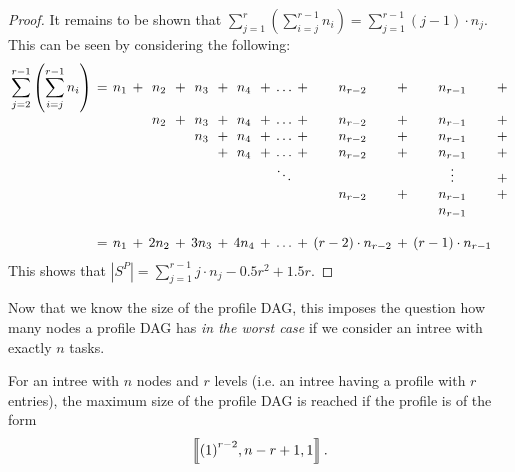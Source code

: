 \begin{proof}
  It remains to be shown that $\sum _{j=1}^{r} \left( \sum _{i=j}^{r-1}n_{{i}} \right) = \sum_{j=1}^{r-1}(j-1)\cdot n_j$. This can be seen by considering the following:
  \begin{eqnarray*}
    \setlength{\arraycolsep}{2pt}
    \begin{array}{cccccccccccccccc}
      \displaystyle
      \sum_{j=2}^{r-1} \left( \sum _{i=j}^{r-1}n_{{i}} \right) &=&
         n_1 & + & n_2 & + & n_3 & + & n_4 & + & \dots & + & n_{r-2} & + & n_{r-1}  & + \\
      & &    &   & n_2 & + & n_3 & + & n_4 & + & \dots & + & n_{r-2} & + & n_{r-1}  & + \\
      & &    &   &     &   & n_3 & + & n_4 & + & \dots & + & n_{r-2} & + & n_{r-1}  & + \\
      & &    &   &     &   &     & + & n_4 & + & \dots & + & n_{r-2} & + & n_{r-1}  & + \\
      & &    &   &     &   &     &  &  &  & \ddots &  &  &  & \vdots  & + \\
      & &    &   &     &   &     &   &     &   &   &   &  n_{r-2}  & +  & n_{r-1}  & +  \\
      & &    &   &     &   &     &   &     &   &   &   &    &   & n_{r-1}  &   \\
      \\
      &=& n_1 &+& 2 n_2 & + & 3 n_3 &+& 4 n_4 &+& \dots & + & (r-2)\cdot n_{r-2} &+& (r-1)\cdot n_{r-1} & \\
    \end{array}
  \end{eqnarray*}
  This shows that $\left|S^P\right| = \sum _{j=1}^{r-1} j \cdot n_j 
    -0.5r^2 + 1.5 r$.
\end{proof}

Now that we know the size of the profile DAG, this imposes the question how many nodes a profile DAG has \emph{in the worst case} if we consider an intree with exactly $n$ tasks.

\begin{lemma}
  \label{lem:profile-dags-form-of-maximum-profile}
  For an intree with $n$ nodes and $r$ levels (i.e. an intree having a profile with $r$ entries), the maximum size of the profile DAG is reached if the profile is of the form
  \begin{equation*}
    \left\llbracket {(1)}^{r-2},n-r+1,1 \right\rrbracket.
  \end{equation*}
\end{lemma}


